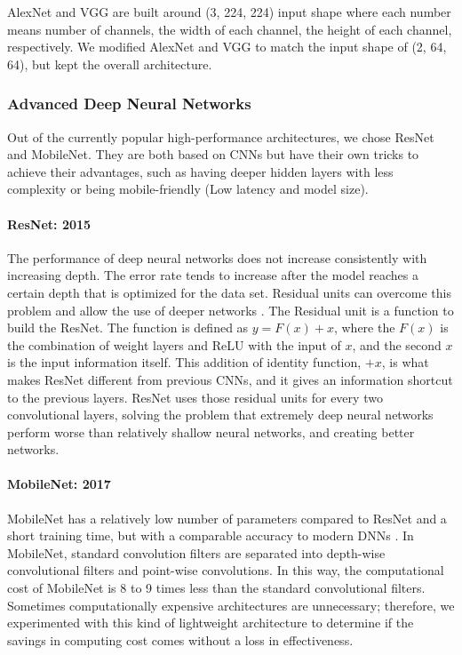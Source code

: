 \documentclass{aastex631}
\begin{document}
AlexNet and VGG are built around (3, 224, 224) input shape where each number means number of channels, the width of each channel, the height of each channel, respectively.
We modified AlexNet and VGG to match the input shape of (2, 64, 64), but kept the overall architecture.

\subsubsection{Advanced Deep Neural Networks}
\label{subsubsect:DNN}
Out of the currently popular high-performance architectures, we chose ResNet and MobileNet. They are both based on CNNs but have their own tricks to achieve their advantages, such as having deeper hidden layers with less complexity or being mobile-friendly (Low latency and model size).

\paragraph{ResNet: 2015}
\label{paragraph:ResNet}
The performance of deep neural networks does not increase consistently with increasing depth. 
The error rate tends to increase after the model reaches a certain depth that is optimized for the data set. 
Residual units can overcome this problem and allow the use of deeper networks \citep{he2015deep}. 
The Residual unit is a function to build the ResNet.
The function is defined as $y=F(x)+x$, where the $F(x)$ is the combination of weight layers and ReLU with the input of $x$, and the second $x$ is the input information itself.
This addition of identity function, $+x$, is what makes ResNet different from previous CNNs, and it gives an information shortcut to the previous layers.
ResNet uses those residual units for every two convolutional layers, solving the problem that extremely deep neural networks perform worse than relatively shallow neural networks, and creating better networks.

\paragraph{MobileNet: 2017}
\label{paragraph:MobileNet}
MobileNet has a relatively low number of parameters compared to ResNet and a short training time, but with a comparable accuracy to modern DNNs \citep{howard2017mobilenets}.
In MobileNet, standard convolution filters are separated into depth-wise convolutional filters and point-wise convolutions. 
In this way, the computational cost of MobileNet is 8 to 9 times less than the standard convolutional filters. 
Sometimes computationally expensive architectures are unnecessary; therefore, we experimented with this kind of lightweight architecture to determine if the savings in computing cost comes without a loss in effectiveness.
\end{document}
